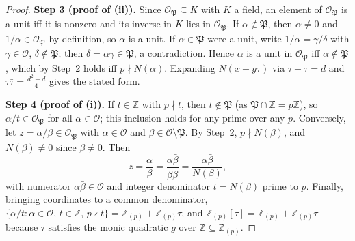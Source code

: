 \begin{proof}
  \textbf{Step 3 (proof of (ii)).}
  Since $\mathcal{O}_{\mathfrak{P}} \subseteq K$ with $K$ a field, an element of
  $\mathcal{O}_{\mathfrak{P}}$ is a unit iff it is nonzero and its inverse in
  $K$ lies in $\mathcal{O}_{\mathfrak{P}}$. If $\alpha \notin \mathfrak{P}$,
  then $\alpha \ne 0$ and $1/\alpha \in \mathcal{O}_{\mathfrak{P}}$ by
  definition, so $\alpha$ is a unit. If $\alpha \in \mathfrak{P}$ were a unit,
  write $1/\alpha = \gamma/\delta$ with $\gamma \in \mathcal{O}$,
  $\delta \notin \mathfrak{P}$; then $\delta = \alpha\gamma \in \mathfrak{P}$,
  a contradiction. Hence $\alpha$ is a unit in $\mathcal{O}_{\mathfrak{P}}$
  iff $\alpha \notin \mathfrak{P}$, which by Step~2 holds iff
  $p \nmid N(\alpha)$. Expanding $N(x + y\tau)$ via
  $\tau + \bar\tau = d$ and $\tau\bar\tau = \frac{d^2-d}{4}$ gives the stated
  form.

  \textbf{Step 4 (proof of (i)).}
  If $t \in \mathbb{Z}$ with $p \nmid t$, then
  $t \notin \mathfrak{P}$ (as $\mathfrak{P} \cap \mathbb{Z} = p\mathbb{Z}$),
  so $\alpha/t \in \mathcal{O}_{\mathfrak{P}}$ for all $\alpha \in \mathcal{O}$;
  this inclusion holds for any prime over any $p$. Conversely, let
  $z = \alpha/\beta \in \mathcal{O}_{\mathfrak{P}}$ with $\alpha \in \mathcal{O}$
  and $\beta \in \mathcal{O} \setminus \mathfrak{P}$. By Step~2,
  $p \nmid N(\beta)$, and $N(\beta) \neq 0$ since $\beta \neq 0$. Then
  \[
    z = \frac{\alpha}{\beta}
      = \frac{\alpha\bar\beta}{\beta\bar\beta}
      = \frac{\alpha\bar\beta}{N(\beta)},
  \]
  with numerator $\alpha\bar\beta \in \mathcal{O}$ and integer denominator
  $t = N(\beta)$ prime to $p$. Finally, bringing coordinates to a common
  denominator,
  $\{\alpha/t : \alpha \in \mathcal{O},\, t \in \mathbb{Z},\, p \nmid t\}
    = \mathbb{Z}_{(p)} + \mathbb{Z}_{(p)}\tau$,
  and $\mathbb{Z}_{(p)}[\tau] = \mathbb{Z}_{(p)} + \mathbb{Z}_{(p)}\tau$
  because $\tau$ satisfies the monic quadratic $g$ over
  $\mathbb{Z} \subseteq \mathbb{Z}_{(p)}$.
\end{proof}

